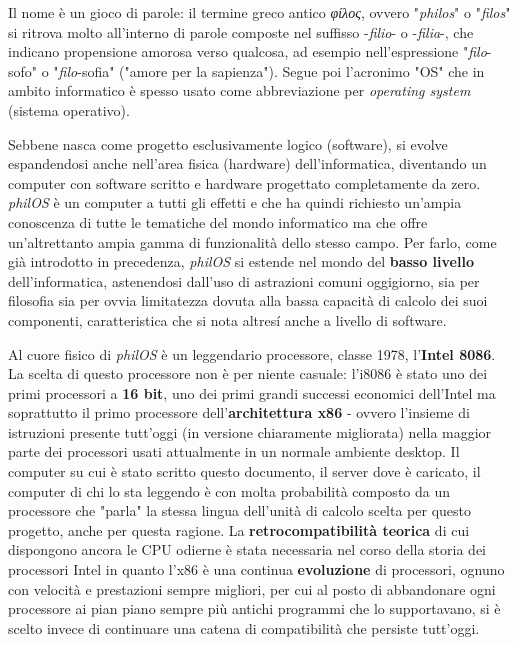 Il nome è un gioco di parole: il termine greco antico \textit{φίλος}, ovvero "\textit{philos}" o "\textit{filos}" si ritrova molto all'interno di parole composte nel suffisso -\textit{filio}- o -\textit{filia}-, che indicano propensione amorosa verso qualcosa, ad esempio nell'espressione "\textit{filo}-sofo" o "\textit{filo}-sofia" ("amore per la sapienza"). Segue poi l'acronimo "OS" che in ambito informatico è spesso usato come abbreviazione per \textit{operating system} (sistema operativo).

Sebbene nasca come progetto esclusivamente logico (software), si evolve espandendosi anche nell'area fisica (hardware) dell'informatica, diventando un computer con software scritto e hardware progettato completamente da zero. \textit{philOS} è un computer a tutti gli effetti e che ha quindi richiesto un'ampia conoscenza di tutte le tematiche del mondo informatico ma che offre un'altrettanto ampia gamma di funzionalità dello stesso campo. Per farlo, come già introdotto in precedenza, \textit{philOS} si estende nel mondo del \textbf{basso livello} dell'informatica, astenendosi dall'uso di astrazioni comuni oggigiorno, sia per filosofia sia per ovvia limitatezza dovuta alla bassa capacità di calcolo dei suoi componenti, caratteristica che si nota altresí anche a livello di software. 

Al cuore fisico di \textit{philOS} è un leggendario processore, classe 1978, l'\textbf{Intel 8086}. La scelta di questo processore non è per niente casuale: l'i8086 è stato uno dei primi processori a \textbf{16 bit}, uno dei primi grandi successi economici dell'Intel ma soprattutto il primo processore dell'\textbf{architettura x86} - ovvero l'insieme di istruzioni presente tutt'oggi (in versione chiaramente migliorata) nella maggior parte dei processori usati attualmente in un normale ambiente desktop. Il computer su cui è stato scritto questo documento, il server dove è caricato, il computer di chi lo sta leggendo è con molta probabilità composto da un processore che "parla" la stessa lingua dell'unità di calcolo scelta per questo progetto, anche per questa ragione. La \textbf{retrocompatibilità teorica} di cui dispongono ancora le CPU odierne è stata necessaria nel corso della storia dei processori Intel in quanto l'x86 è una continua \textbf{evoluzione} di processori, ognuno con velocità e prestazioni sempre migliori, per cui al posto di abbandonare ogni processore ai pian piano sempre più antichi programmi che lo supportavano, si è scelto invece di continuare una catena di compatibilità che persiste tutt'oggi.

